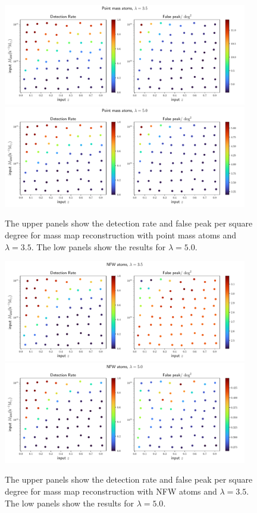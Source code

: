 \documentclass[twocolumn]{aastex62}
\begin{document}
\begin{figure}[!ht]
 \centering
 \includegraphics[width=0.95\textwidth]{detfalseRate_f1-1.pdf}
 \includegraphics[width=0.95\textwidth]{detfalseRate_f1-3.pdf}
 \caption{The upper panels show the detection rate and false peak per square degree for mass map reconstruction with
point mass atoms and $\lambda=3.5$. The low panels show the results for $\lambda=5.0$. }
\end{figure}


\begin{figure}[!ht]
 \centering
 \includegraphics[width=0.95\textwidth]{detfalseRate_f3-1.pdf}
 \includegraphics[width=0.95\textwidth]{detfalseRate_f3-3.pdf}
 \caption{The upper panels show the detection rate and false peak per square degree for mass map reconstruction with
NFW atoms and $\lambda=3.5$. The low panels show the results for $\lambda=5.0$. }
\end{figure}
\end{document}
